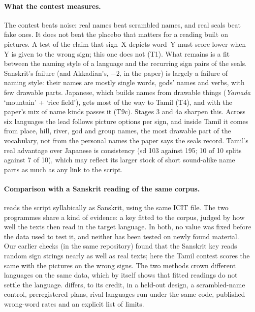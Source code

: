 \documentclass[11pt,a4paper]{article}
\begin{document}
\paragraph{What the contest measures.} The contest beats noise: real names beat scrambled names, and real seals beat fake ones. It does not beat the placebo that matters for a reading built on pictures. A test of the claim that sign~X depicts word~Y must score lower when Y is given to the wrong sign; this one does not (T1). What remains is a fit between the naming style of a language and the recurring sign pairs of the seals. Sanskrit's failure (and Akkadian's, $-2$, in the paper) is largely a failure of naming style: their names are mostly single words, gods' names and verbs, with few drawable parts. Japanese, which builds names from drawable things (\emph{Yamada} `mountain' + `rice field'), gets most of the way to Tamil (T4), and with the paper's mix of name kinds passes it (T9c). Stages 3 and 4a sharpen this. Across six languages the lead follows picture options per sign, and inside Tamil it comes from place, hill, river, god and group names, the most drawable part of the vocabulary, not from the personal names the paper says the seals record. Tamil's real advantage over Japanese is consistency (sd 103 against 195; 10 of 10 splits against 7 of 10), which may reflect its larger stock of short sound-alike name parts as much as any link to the script.

\paragraph{Comparison with a Sanskrit reading of the same corpus.} \citet{lipi} reads the script syllabically as Sanskrit, using the same ICIT file. The two programmes share a kind of evidence: a key fitted to the corpus, judged by how well the texts then read in the target language. In both, no value was fixed before the data used to test it, and neither has been tested on newly found material. Our earlier checks (in the same repository) found that the Sanskrit key reads random sign strings nearly as well as real texts; here the Tamil contest scores the same with the pictures on the wrong signs. The two methods crown different languages on the same data, which by itself shows that fitted readings do not settle the language. \citet{raj2026} differs, to its credit, in a held-out design, a scrambled-name control, preregistered plans, rival languages run under the same code, published wrong-word rates and an explicit list of limits.
\end{document}

